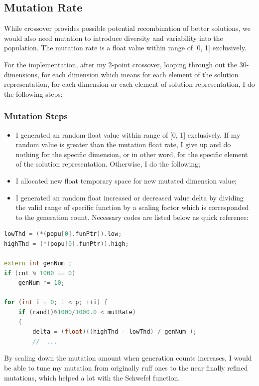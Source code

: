 \documentclass[10pt,b5paper]{article}
\begin{document}
\subsection{Mutation Rate}
\label{sec-2-9}
While crossover provides possible potential recombination of better solutions, we would also need mutation to introduce diversity and variability into the population. The mutation rate is a float value within range of [0, 1] exclusively.

For the implementation, after my 2-point crossover, looping through out the 30-dimensions, for each dimension which means for each element of the solution representation, for each dimension or each element of solution representation, I do the following steps:
\subsubsection{Mutation Steps}
\label{sec-2-9-1}
\begin{itemize}
\item I generated an random float value within range of [0, 1] exclusively. If my random value is greater than the mutation float rate, I give up and do nothing for the specific dimension, or in other word, for the specific element of the solution representation. Otherwise, I do the following;
\item I allocated new float temporary space for new mutated dimension value;
\item I generated an random float increased or decreased value delta by dividing the valid range of specific function by a scaling factor which is corresponded to the generation count. Necessary codes are listed below as quick reference:
\end{itemize}
\begin{lstlisting}[language=c++]
lowThd = (*(popu[0].funPtr)).low;
highThd = (*(popu[0].funPtr)).high;

extern int genNum ;
if (cnt % 1000 == 0)  
    genNum *= 10;    

for (int i = 0; i < p; ++i) {
    if (rand()%1000/1000.0 < mutRate) 
    {
        delta = (float)((highThd - lowThd) / genNum );
        //  ...
\end{lstlisting}
By scaling down the mutation amount when generation counts increases, I would be able to tune my mutation from originally ruff ones to the near finally refined mutations, which helped a lot with the Schwefel function.
\end{document}
